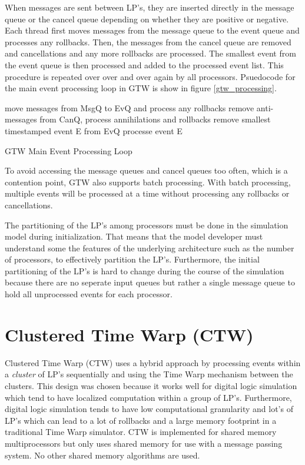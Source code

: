 \documentclass[11pt]{book}
\begin{document}
\noindent
When messages are sent between LP's, they are inserted directly in the message queue or
the cancel queue depending on whether they are positive or negative. Each thread first moves
messages from the message queue to the event queue and processes any rollbacks. Then, the
messages from the cancel queue are removed and cancellations and any more rollbacks are
processed. The smallest event from the event queue is then processed and added to the
processed event list. This procedure is repeated over over and over again by all processors.
Psuedocode for the main event processing loop in GTW is show in figure \ref{gtw_processing}.

\begin{algorithm}
\DontPrintSemicolon
\SetAlgoVlined
     {
        move messages from MsgQ to EvQ and process any rollbacks\;
        remove anti-messages from CanQ, process annihilations and rollbacks\;
        remove smallest timestamped event E from EvQ\;
        processe event E\;
    }
\caption{GTW Main Event Processing Loop\cite{das-94}\cite{fujimoto-94}\label{gtw_processing}}
\end{algorithm}

\noindent
To avoid accessing the message queues and cancel queues too often, which is a contention point,
GTW also supports batch processing. With batch processing, multiple events will be processed
at a time without processing any rollbacks or cancellations.

The partitioning of the LP's among processors must be done in the simulation model during
initialization. That means that the model developer must understand some the features of
the underlying architecture such as the number of processors, to effectively partition the
LP's. Furthermore, the initial partitioning of the LP's is hard to change during the course
of the simulation because there are no seperate input queues but rather a single message
queue to hold all unprocessed events for each processor.

\section{Clustered Time Warp (CTW)}

Clustered Time Warp\cite{avril-95} (CTW) uses a hybrid approach by processing events within
a \emph{cluster} of LP's sequentially and using the Time Warp mechanism between the clusters.
This design was chosen because it works well for digital logic simulation which tend to have
localized computation within a group of LP's. Furthermore, digital logic simulation tends to
have low computational granularity and lot's of LP's which can lead to a lot of rollbacks
and a large memory footprint in a traditional Time Warp simulator. CTW is implemented for
shared memory multiprocessors but only uses shared memory for use with a message passing
system. No other shared memory algorithms are used.
\end{document}
